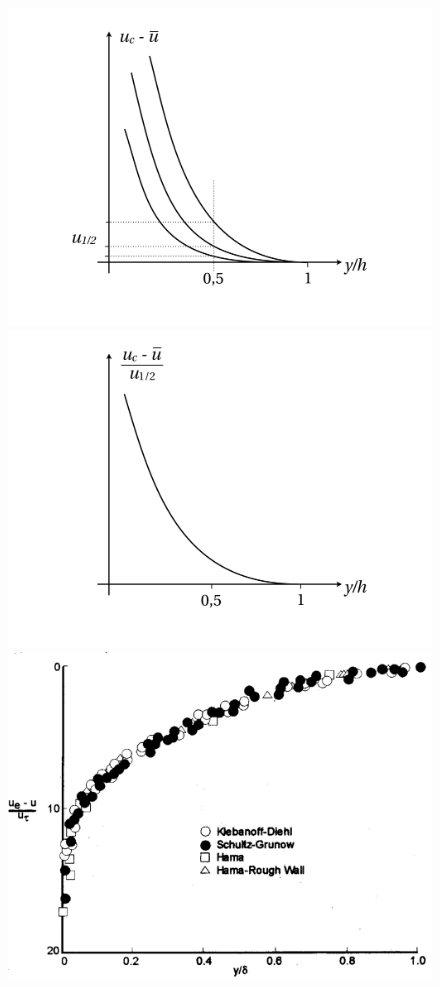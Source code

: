 \begin{figure}[h]
\begin{center}
      \includegraphics[scale=0.19]{ch4/12} \quad  \includegraphics[scale=0.185]{ch4/13} \quad \includegraphics[scale=0.24]{ch4/14}
\label{fig:4.12}
\end{center}
\end{figure}

